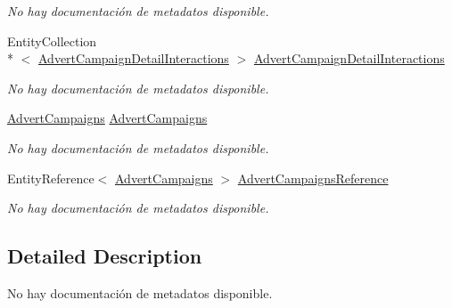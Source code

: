 \begin{DoxyCompactItemize}
\begin{DoxyCompactList}\small\item\em No hay documentación de metadatos disponible. \end{DoxyCompactList}\item 
Entity\-Collection\\*
$<$ \hyperlink{class_microsoft_1_1_samples_1_1_kinect_1_1_basic_interactions_1_1_advert_campaign_detail_interactions}{Advert\-Campaign\-Detail\-Interactions} $>$ \hyperlink{class_microsoft_1_1_samples_1_1_kinect_1_1_basic_interactions_1_1_advert_campaign_interactions_a1bf8713ddb46c5caf153032905bdd967}{Advert\-Campaign\-Detail\-Interactions}
\begin{DoxyCompactList}\small\item\em No hay documentación de metadatos disponible. \end{DoxyCompactList}\item 
\hyperlink{class_microsoft_1_1_samples_1_1_kinect_1_1_basic_interactions_1_1_advert_campaigns}{Advert\-Campaigns} \hyperlink{class_microsoft_1_1_samples_1_1_kinect_1_1_basic_interactions_1_1_advert_campaign_interactions_ac3d5b88ba436c1b4dbcdb6509ff43de3}{Advert\-Campaigns}
\begin{DoxyCompactList}\small\item\em No hay documentación de metadatos disponible. \end{DoxyCompactList}\item 
Entity\-Reference$<$ \hyperlink{class_microsoft_1_1_samples_1_1_kinect_1_1_basic_interactions_1_1_advert_campaigns}{Advert\-Campaigns} $>$ \hyperlink{class_microsoft_1_1_samples_1_1_kinect_1_1_basic_interactions_1_1_advert_campaign_interactions_ad620c06052e3a8531f434279411191ae}{Advert\-Campaigns\-Reference}
\begin{DoxyCompactList}\small\item\em No hay documentación de metadatos disponible. \end{DoxyCompactList}\end{DoxyCompactItemize}


\subsection{Detailed Description}
No hay documentación de metadatos disponible. 




